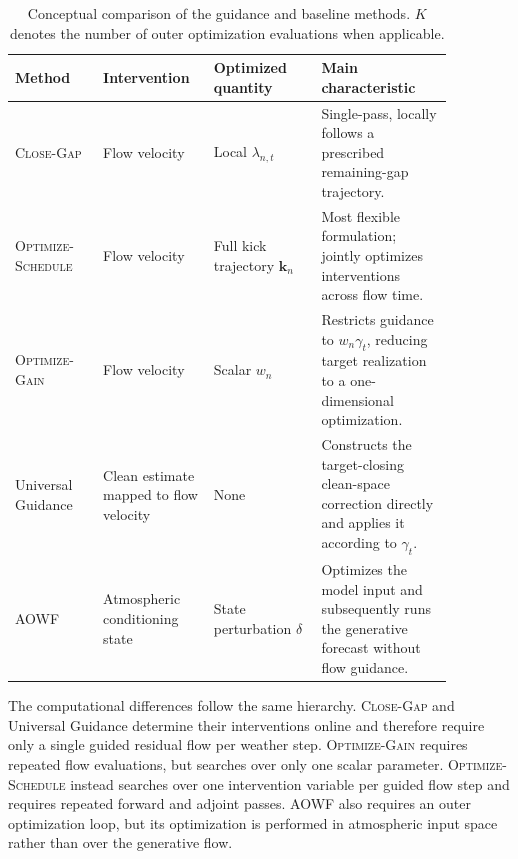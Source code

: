 \begin{table}[t]
    \centering
    \caption{
        Conceptual comparison of the guidance and baseline methods.
        \(K\) denotes the number of outer optimization evaluations when
        applicable.
    }
    \label{tab:guidance-method-comparison}
    \small
    \begin{tabular}{p{0.18\linewidth} p{0.20\linewidth} p{0.22\linewidth} p{0.27\linewidth}}
        \toprule
        \textbf{Method}
        & \textbf{Intervention}
        & \textbf{Optimized quantity}
        & \textbf{Main characteristic} \\
        \midrule

        \textsc{Close-Gap}
        & Flow velocity
        & Local \(\lambda_{n,t}\)
        & Single-pass, locally follows a prescribed remaining-gap trajectory. \\

        \textsc{Optimize-Schedule}
        & Flow velocity
        & Full kick trajectory \(\mathbf{k}_n\)
        & Most flexible formulation; jointly optimizes interventions across flow time. \\

        \textsc{Optimize-Gain}
        & Flow velocity
        & Scalar \(w_n\)
        & Restricts guidance to \(w_n\gamma_t\), reducing target realization to a one-dimensional optimization. \\

        Universal Guidance
        & Clean estimate mapped to flow velocity
        & None
        & Constructs the target-closing clean-space correction directly and applies it according to \(\gamma_t\). \\

        AOWF
        & Atmospheric conditioning state
        & State perturbation \(\delta\)
        & Optimizes the model input and subsequently runs the generative forecast without flow guidance. \\

        \bottomrule
    \end{tabular}
\end{table}

The computational differences follow the same hierarchy.
\textsc{Close-Gap} and Universal Guidance determine their interventions online
and therefore require only a single guided residual flow per weather step.
\textsc{Optimize-Gain} requires repeated flow evaluations, but searches over
only one scalar parameter. \textsc{Optimize-Schedule} instead searches over
one intervention variable per guided flow step and requires repeated forward
and adjoint passes. AOWF also requires an outer optimization loop, but its
optimization is performed in atmospheric input space rather than over the
generative flow.

